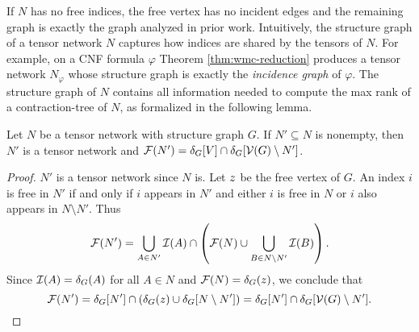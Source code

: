 If $N$ has no free indices, the free vertex has no incident edges and the remaining graph is exactly the graph analyzed in prior work. Intuitively, the structure graph of a tensor network $N$ captures how indices are shared by the tensors of $N$. For example, on a CNF formula $\varphi$ Theorem \ref{thm:wmc-reduction} produces a tensor network $N_\varphi$ whose structure graph is exactly the \emph{incidence graph} of $\varphi$. The structure graph of $N$ contains all information needed to compute the max rank of a contraction-tree of $N$, as formalized in the following lemma.
\begin{lemma} \label{lemma:tcn-equiv-structure}
	Let $N$ be a tensor network with structure graph $G$. If $N' \subseteq N$ is nonempty, then $N'$ is a tensor network and $\mathcal{F}(N') = \delta_{G}[V] \cap \delta_{G}[\mathcal{V}(G) \setminus N']$.
\end{lemma}
\begin{proof}
	$N'$ is a tensor network since $N$ is. Let $z$ be the free vertex of $G$.
	An index $i$ is free in $N'$ if and only if $i$ appears in $N'$ and either $i$ is free in $N$ or $i$ also appears in $N \setminus N'$. Thus
    $$\mathcal{F}(N') = \bigcup_{A \in N'} \mathcal{I}(A) \cap \left( \mathcal{F}(N) \cup \bigcup_{B \in N \setminus N'} \mathcal{I}(B) \right).$$
	Since $\mathcal{I}(A) = \delta_{G}(A)$ for all $A \in N$ and $\mathcal{F}(N) = \delta_{G}(z)$, we conclude that
	$$\mathcal{F}(N') = \delta_{G}[N'] \cap (\delta_{G}(z) \cup \delta_{G}[N \setminus N']) =  \delta_{G}[N'] \cap \delta_{G}[\mathcal{V}(G) \setminus N'].$$
\end{proof}




